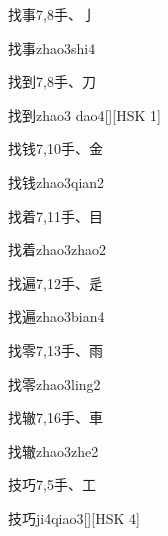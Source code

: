 \begin{entry}{找事}{7,8}{⼿、⼅}
  \begin{phonetics}{找事}{zhao3shi4}
  \end{phonetics}
\end{entry}

\begin{entry}{找到}{7,8}{⼿、⼑}
  \begin{phonetics}{找到}{zhao3 dao4}[][HSK 1]
  \end{phonetics}
\end{entry}

\begin{entry}{找钱}{7,10}{⼿、⾦}
  \begin{phonetics}{找钱}{zhao3qian2}
  \end{phonetics}
\end{entry}

\begin{entry}{找着}{7,11}{⼿、⽬}
  \begin{phonetics}{找着}{zhao3zhao2}
  \end{phonetics}
\end{entry}

\begin{entry}{找遍}{7,12}{⼿、⾡}
  \begin{phonetics}{找遍}{zhao3bian4}
  \end{phonetics}
\end{entry}

\begin{entry}{找零}{7,13}{⼿、⾬}
  \begin{phonetics}{找零}{zhao3ling2}
  \end{phonetics}
\end{entry}

\begin{entry}{找辙}{7,16}{⼿、⾞}
  \begin{phonetics}{找辙}{zhao3zhe2}
  \end{phonetics}
\end{entry}

\begin{entry}{技巧}{7,5}{⼿、⼯}
  \begin{phonetics}{技巧}{ji4qiao3}[][HSK 4]
  \end{phonetics}
\end{entry}

